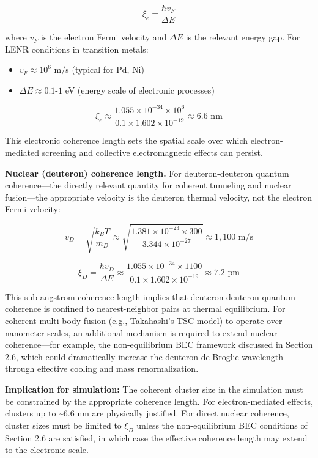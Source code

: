 \documentclass[11pt,a4paper]{article}
\begin{document}
\begin{equation}
\xi_e = \frac{\hbar v_F}{\Delta E}
\end{equation}

where $v_F$ is the electron Fermi velocity and $\Delta E$ is the relevant energy gap. For LENR conditions in transition metals:

\begin{itemize}
\item
  $v_F \approx 10^6$ m/s (typical for Pd, Ni)
\item
  $\Delta E \approx 0.1\text{-}1$ eV (energy scale of electronic processes)
\end{itemize}

\begin{equation}
\xi_e \approx \frac{1.055 \times 10^{-34} \times 10^6}{0.1 \times 1.602 \times 10^{-19}} \approx 6.6 \text{ nm}
\end{equation}

This electronic coherence length sets the spatial scale over which electron-mediated screening and collective electromagnetic effects can persist.

\textbf{Nuclear (deuteron) coherence length.} For deuteron-deuteron quantum coherence---the directly relevant quantity for coherent tunneling and nuclear fusion---the appropriate velocity is the deuteron thermal velocity, not the electron Fermi velocity:

\begin{equation}
v_D = \sqrt{\frac{k_B T}{m_D}} \approx \sqrt{\frac{1.381 \times 10^{-23} \times 300}{3.344 \times 10^{-27}}} \approx 1{,}100 \text{ m/s}
\end{equation}

\begin{equation}
\xi_D = \frac{\hbar v_D}{\Delta E} \approx \frac{1.055 \times 10^{-34} \times 1100}{0.1 \times 1.602 \times 10^{-19}} \approx 7.2 \text{ pm}
\end{equation}

This sub-angstrom coherence length implies that deuteron-deuteron quantum coherence is confined to nearest-neighbor pairs at thermal equilibrium. For coherent multi-body fusion (e.g., Takahashi's TSC model) to operate over nanometer scales, an additional mechanism is required to extend nuclear coherence---for example, the non-equilibrium BEC framework discussed in Section 2.6, which could dramatically increase the deuteron de Broglie wavelength through effective cooling and mass renormalization.

\textbf{Implication for simulation:} The coherent cluster size in the simulation must be constrained by the appropriate coherence length. For electron-mediated effects, clusters up to \textasciitilde6.6 nm are physically justified. For direct nuclear coherence, cluster sizes must be limited to $\xi_D$ unless the non-equilibrium BEC conditions of Section 2.6 are satisfied, in which case the effective coherence length may extend to the electronic scale.
\end{document}
